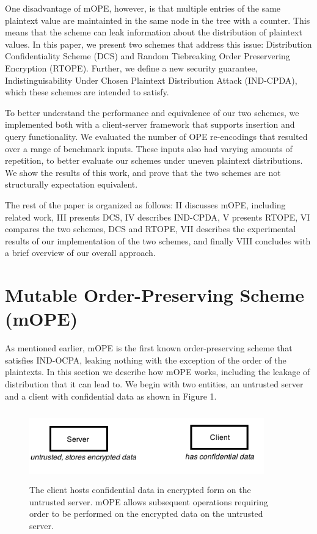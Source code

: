 \documentclass[12pt]{article}
\begin{document}
One disadvantage of mOPE, however, is that multiple entries of the same plaintext value are maintainted in the same node in the tree with a counter. This means that the scheme can leak information about the distribution of plaintext values. In this paper, we present two schemes that address this issue: Distribution Confidentiality Scheme (DCS) and Random Tiebreaking Order Preservering Encryption (RTOPE). Further, we define a new security guarantee, Indistinguisability Under Chosen Plaintext Distribution Attack (IND-CPDA), which these schemes are intended to satisfy.

To better understand the performance and equivalence of our two schemes, we implemented both with a client-server framework that supports insertion and query functionality. We evaluated the number of OPE re-encodings that resulted over a range of benchmark inputs. These inputs also had varying amounts of repetition, to better evaluate our schemes under uneven plaintext distributions. We show the results of this work, and prove that the two schemes are not structurally expectation equivalent.

The rest of the paper is organized as follows: II discusses mOPE, including related work, III presents DCS, IV describes IND-CPDA, V presents RTOPE, VI compares the two schemes, DCS and RTOPE, VII describes the experimental results of our implementation of the two schemes, and finally VIII concludes with a brief overview of our overall approach. 

\section{Mutable Order-Preserving Scheme (mOPE)}

As mentioned earlier, mOPE is the first known order-preserving scheme that satisfies IND-OCPA, leaking nothing with the exception of the order of the plaintexts. In this section we describe how mOPE works, including the leakage of distribution that it can lead to. We begin with two entities, an untrusted server and a client with confidential data as shown in Figure 1.

\begin{figure}[htb]
\begin{center}
\includegraphics[height=1.2in,width=4in,angle=0]{857pic4.png}
\caption{The client hosts confidential data in encrypted form on the untrusted server. mOPE allows subsequent operations requiring order to be performed on the encrypted data on the untrusted server.}
\end{center}
\end{figure}
\end{document}
